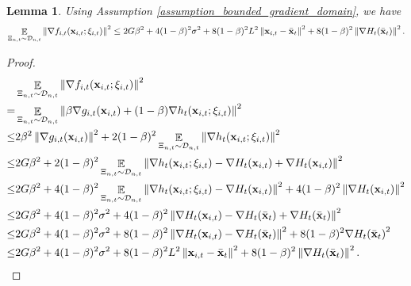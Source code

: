 \documentclass{article}
\newtheorem{Lemma}{\bf{Lemma}}
\begin{document}
\begin{Lemma}
\label{lemma_stochastic_gradient_norm_bound}
Using Assumption \ref{assumption_bounded_gradient_domain}, we have
\begin{align}
\nonumber
\mathop{\mathbb{E}}_{ \Xi_{n,t} \sim \mathcal{D}_{n,t} }\left\lVert \nabla f_{i,t}({\bf x}_{i,t};\xi_{i,t})\right\rVert^2 \le 2G\beta^2  +  4(1-\beta)^2 \sigma^2 +  8(1-\beta)^2 L^2 \left\lVert {\bf x}_{i,t} - \bar{{\bf x}}_t \right\rVert^2 + 8(1-\beta)^2 \left\lVert\nabla H_t(\bar{{\bf x}}_t)\right\rVert^2.
\end{align}


\end{Lemma}
\begin{proof}

\begin{align}
\nonumber
& \mathop{\mathbb{E}}_{ \Xi_{n,t} \sim \mathcal{D}_{n,t} }\left\lVert \nabla f_{i,t}({\bf x}_{i,t};\xi_{i,t})\right\rVert^2 \\ \nonumber 
= & \mathop{\mathbb{E}}_{ \Xi_{n,t} \sim \mathcal{D}_{n,t} }\left\lVert \beta \nabla g_{i,t}({\bf x}_{i,t}) + (1-\beta)\nabla h_t({\bf x}_{i,t};\xi_{i,t})\right\rVert^2 \\ \nonumber 
\le &  2\beta^2 \left\lVert \nabla g_{i,t}({\bf x}_{i,t}) \right\rVert^2 + 2(1-\beta)^2 \mathop{\mathbb{E}}_{ \Xi_{n,t} \sim \mathcal{D}_{n,t} } \left\lVert \nabla h_t({\bf x}_{i,t};\xi_{i,t}) \right\rVert^2 \\ \nonumber 
\le & 2G\beta^2  + 2(1-\beta)^2 \mathop{\mathbb{E}}_{ \Xi_{n,t} \sim \mathcal{D}_{n,t} } \left\lVert \nabla h_t({\bf x}_{i,t};\xi_{i,t}) - \nabla H_t({\bf x}_{i,t}) + \nabla H_t({\bf x}_{i,t})\right\rVert^2 \\ \nonumber 
\le & 2G\beta^2  +  4(1-\beta)^2 \mathop{\mathbb{E}}_{ \Xi_{n,t} \sim \mathcal{D}_{n,t} } \left\lVert \nabla h_t({\bf x}_{i,t};\xi_{i,t}) - \nabla H_t({\bf x}_{i,t}) \right\rVert^2 +  4(1-\beta)^2 \left\lVert \nabla H_t({\bf x}_{i,t})\right\rVert^2 \\ \nonumber
\le & 2G\beta^2  +  4(1-\beta)^2 \sigma^2 +  4(1-\beta)^2 \left\lVert \nabla H_t({\bf x}_{i,t}) - \nabla H_t(\bar{{\bf x}}_t) + \nabla H_t(\bar{{\bf x}}_t)\right\rVert^2 \\ \nonumber
\le & 2G\beta^2  +  4(1-\beta)^2 \sigma^2 +  8(1-\beta)^2 \left\lVert \nabla H_t({\bf x}_{i,t}) - \nabla H_t(\bar{{\bf x}}_t) \right\rVert^2 + 8(1-\beta)^2 {\nabla H_t(\bar{{\bf x}}_t)}^2 \\ \nonumber
\le & 2G\beta^2  +  4(1-\beta)^2 \sigma^2 +  8(1-\beta)^2 L^2 \left\lVert {\bf x}_{i,t} - \bar{{\bf x}}_t \right\rVert^2 + 8(1-\beta)^2 \left\lVert\nabla H_t(\bar{{\bf x}}_t)\right\rVert^2.
\end{align} 
\end{proof}
\end{document}
